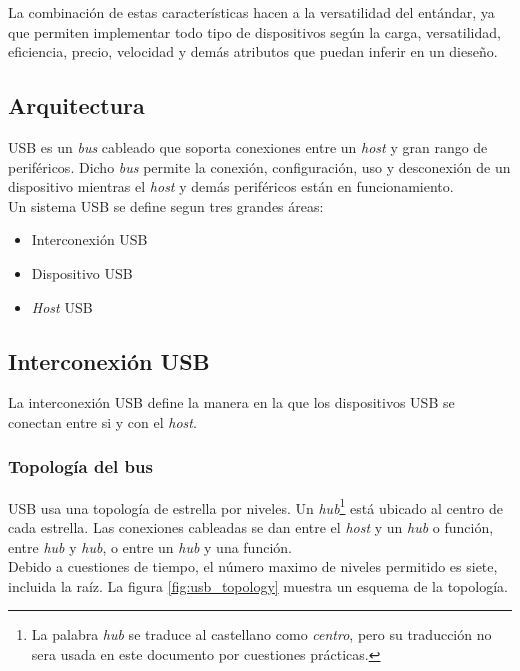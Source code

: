 La combinaci\'on de estas caracter\'isticas hacen a la versatilidad del
ent\'andar, ya que permiten implementar todo tipo de dispositivos seg\'un la
carga, versatilidad, eficiencia, precio, velocidad y dem\'as atributos que
puedan inferir en un diese\~no.

\subsection{Arquitectura}

USB es un \emph{bus} cableado que soporta conexiones entre un \emph{host} y
gran rango de perif\'ericos. Dicho \emph{bus} permite la conexi\'on,
configuraci\'on, uso y desconexi\'on de un dispositivo mientras el \emph{host}
y dem\'as perif\'ericos est\'an en funcionamiento. \\

Un sistema USB se  define segun tres grandes \'areas:

\begin{itemize}
 \item Interconexi\'on USB
 \item Dispositivo USB
 \item \emph{Host} USB
\end{itemize}

\subsection{Interconexi\'on USB}

La interconexi\'on USB define la manera en la que los dispositivos USB se
conectan entre si y con el \emph{host}. 

\subsubsection{Topolog\'ia del bus}

USB usa una topolog\'ia de estrella por niveles. Un \emph{hub}\footnote{La
palabra \emph{hub} se traduce al castellano como \emph{centro}, pero su
traducci\'on no sera usada en este documento por cuestiones pr\'acticas.}
est\'a ubicado al centro de cada estrella. Las conexiones cableadas se dan
entre el \emph{host} y un \emph{hub} o funci\'on, entre \emph{hub} y
\emph{hub}, o entre un \emph{hub} y una funci\'on. \\

Debido a cuestiones de tiempo, el n\'umero maximo de niveles permitido es
siete, incluida la ra\'iz. La figura \ref{fig:usb_topology} muestra un esquema
de la topolog\'ia.

